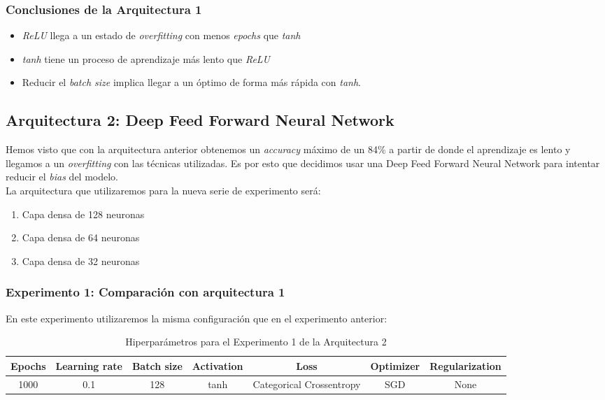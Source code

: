 \documentclass{article}
\begin{document}
		\subsubsection{Conclusiones de la Arquitectura 1}
		\label{d-cl-a1}
			\begin{itemize}
				\item \textit{ReLU} llega a un estado de \textit{overfitting} con menos \textit{epochs} que \textit{tanh}
				\item \textit{tanh} tiene un proceso de aprendizaje m\'as lento que \textit{ReLU}
				\item Reducir el \textit{batch size} implica llegar a un \'optimo de forma m\'as r\'apida con \textit{tanh}.
			\end{itemize}
			
	\subsection{Arquitectura 2: Deep Feed Forward Neural Network}
	\label{d-s-a2}
		Hemos visto que con la arquitectura anterior obtenemos un \textit{accuracy} m\'aximo de un 84\% a partir de donde el aprendizaje es lento y llegamos a un \textit{overfitting} con las t\'ecnicas utilizadas. Es por esto que decidimos usar una Deep Feed Forward Neural Network para intentar reducir el \textit{bias} del modelo.\\
		La arquitectura que utilizaremos para la nueva serie de experimento ser\'a:
		
		\begin{enumerate}
			\item Capa densa de 128 neuronas
			\item Capa densa de 64 neuronas
			\item Capa densa de 32 neuronas
		\end{enumerate}
		
		\subsubsection{Experimento 1: Comparaci\'on con arquitectura 1}
		\label{d-s-a2-e1}
			En este experimento utilizaremos la misma configuraci\'on que en el experimento anterior:
			\begin{table}[!h]
				\begin{center}
					\begin{tabular}{| c | c | c | c | c | c | c |}
						\textbf{Epochs} & \textbf{Learning rate} & \textbf{Batch size} & \textbf{Activation} & \textbf{Loss} & \textbf{Optimizer} & \textbf{Regularization} \\ \hline
						1000 & 0.1 & 128 & tanh & Categorical Crossentropy & SGD & None
					\end{tabular}
					\caption{Hiperpar\'ametros para el Experimento 1 de la Arquitectura 2}
					\label{tab:hip-d-a2-e1}
				\end{center}
			\end{table}
			
\end{document}

